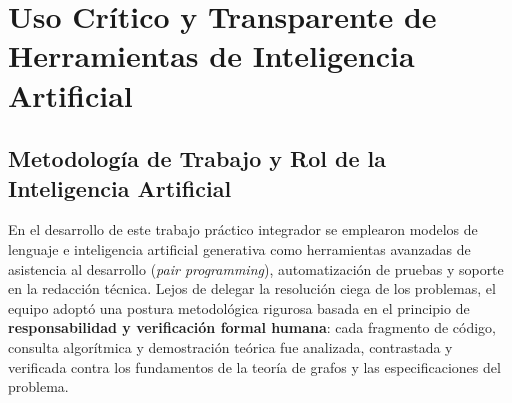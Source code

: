 \documentclass[11pt,a4paper]{article}
\begin{document}
\section{Uso Crítico y Transparente de Herramientas de Inteligencia Artificial}

\subsection{Metodología de Trabajo y Rol de la Inteligencia Artificial}
En el desarrollo de este trabajo práctico integrador se emplearon modelos de lenguaje e inteligencia artificial generativa como herramientas avanzadas de asistencia al desarrollo (\textit{pair programming}), automatización de pruebas y soporte en la redacción técnica. Lejos de delegar la resolución ciega de los problemas, el equipo adoptó una postura metodológica rigurosa basada en el principio de \textbf{responsabilidad y verificación formal humana}: cada fragmento de código, consulta algorítmica y demostración teórica fue analizada, contrastada y verificada contra los fundamentos de la teoría de grafos y las especificaciones del problema.
\end{document}
